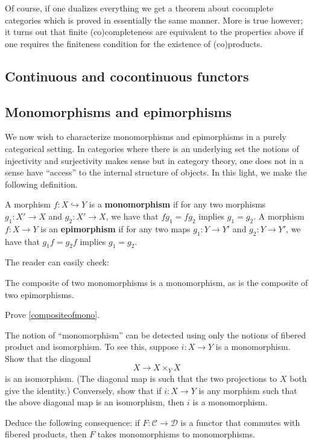 Of course, if one dualizes everything we get a theorem about cocomplete
categories which is proved in essentially the same manner. More is true
however; it turns out that finite (co)completeness are equivalent to the
properties above if one requires the finiteness condition for the existence of
(co)products.

\subsection{Continuous and cocontinuous functors}
\subsection{Monomorphisms and epimorphisms}
We now wish to characterize monomorphisms and epimorphisms in a purely
categorical setting. In categories where there is an underlying set the notions
of injectivity and surjectivity makes sense but in category theory, one
does not
in a sense have ``access'' to the internal structure of objects. In this light,
we make the following definition.

\begin{definition}
A morphism $f:X\hookrightarrow Y$ is a \textbf{monomorphism} if for any two morphisms
$g_1:X'\rightarrow X$ and $g_2:X'\rightarrow X$, we have that $f g_1 = f g_2$
implies $g_1=g_2$. A morphism $f:X\rightarrow Y$ is an \textbf{epimorphism} if for any two
maps $g_1:Y\rightarrow Y'$ and $g_2:Y\rightarrow Y'$, we have that $g_1 f = g_2
f$ implies $g_1 = g_2$.
\end{definition}


The reader can easily check:

\begin{proposition}  \label{compositeofmono}
The composite of two monomorphisms is a monomorphism, as is the composite of
two epimorphisms.
\end{proposition} 

\begin{exercise} 
Prove \cref{compositeofmono}. 
\end{exercise} 


\begin{exercise} 
The notion of ``monomorphism'' can be detected using only the notions of
fibered product and isomorphism. To see this, suppose $i: X \to Y$ is a
monomorphism. Show that the diagonal
\[ X \to X \times_Y X  \]
is an isomorphism. (The diagonal map is such that the two
projections to $X$ both give the identity.) Conversely, show that if $i: X \to Y$ is any morphism such
that the above diagonal map is an isomorphism, then $i$ is a monomorphism.

Deduce the following consequence: if $F: \mathcal{C} \to \mathcal{D}$ is a
functor that commutes with fibered products, then $F $ takes monomorphisms to
monomorphisms.
\end{exercise} 


